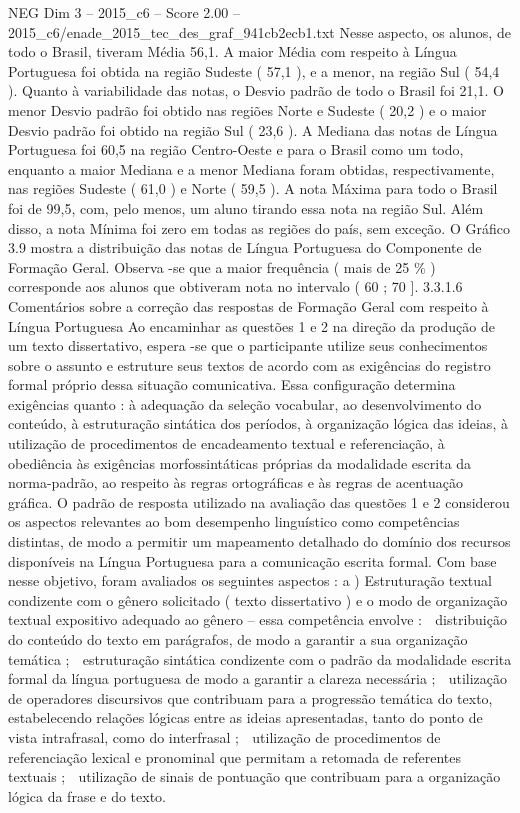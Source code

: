 \begin{textsample}{NEG Dim 3 – 2015\_c6 – Score 2.00 – 2015\_c6/enade\_2015\_tec\_des\_graf\_941cb2ecb1.txt}
Nesse aspecto, os alunos, de todo o Brasil, tiveram Média 56,1.
A maior Média com respeito à Língua Portuguesa foi obtida na região Sudeste ( 57,1 ), e a menor, na região Sul ( 54,4 ).
Quanto à variabilidade das notas, o Desvio padrão de todo o Brasil foi 21,1.
O menor Desvio padrão foi obtido nas regiões Norte e Sudeste ( 20,2 ) e o maior Desvio padrão foi obtido na região Sul ( 23,6 ).
A Mediana das notas de Língua Portuguesa foi 60,5 na região Centro-Oeste e para o Brasil como um todo, enquanto a maior Mediana e a menor Mediana foram obtidas, respectivamente, nas regiões Sudeste ( 61,0 ) e Norte ( 59,5 ).
A nota Máxima para todo o Brasil foi de 99,5, com, pelo menos, um aluno tirando essa nota na região Sul.
Além disso, a nota Mínima foi zero em todas as regiões do país, sem exceção.
O Gráfico 3.9 mostra a distribuição das notas de Língua Portuguesa do Componente de Formação Geral.
Observa -se que a maior frequência ( mais de 25 \% ) corresponde aos alunos que obtiveram nota no intervalo ( 60 ; 70 ]. 3.3.1.6 Comentários sobre a correção das respostas de Formação Geral com respeito à Língua Portuguesa Ao encaminhar as questões 1 e 2 na direção da produção de um texto dissertativo, espera -se que o participante utilize seus conhecimentos sobre o assunto e estruture seus textos de acordo com as exigências do registro formal próprio dessa situação comunicativa.
Essa configuração determina exigências quanto : à adequação da seleção vocabular, ao desenvolvimento do conteúdo, à estruturação sintática dos períodos, à organização lógica das ideias, à utilização de procedimentos de encadeamento textual e referenciação, à obediência às exigências morfossintáticas próprias da modalidade escrita da norma-padrão, ao respeito às regras ortográficas e às regras de acentuação gráfica.
O padrão de resposta utilizado na avaliação das questões 1 e 2 considerou os aspectos relevantes ao bom desempenho linguístico como competências distintas, de modo a permitir um mapeamento detalhado do domínio dos recursos disponíveis na Língua Portuguesa para a comunicação escrita formal.
Com base nesse objetivo, foram avaliados os seguintes aspectos : a ) Estruturação textual condizente com o gênero solicitado ( texto dissertativo ) e o modo de organização textual expositivo adequado ao gênero – essa competência envolve :  distribuição do conteúdo do texto em parágrafos, de modo a garantir a sua organização temática ;  estruturação sintática condizente com o padrão da modalidade escrita formal da língua portuguesa de modo a garantir a clareza necessária ;  utilização de operadores discursivos que contribuam para a progressão temática do texto, estabelecendo relações lógicas entre as ideias apresentadas, tanto do ponto de vista intrafrasal, como do interfrasal ;  utilização de procedimentos de referenciação lexical e pronominal que permitam a retomada de referentes textuais ;  utilização de sinais de pontuação que contribuam para a organização lógica da frase e do texto.

\end{textsample}
